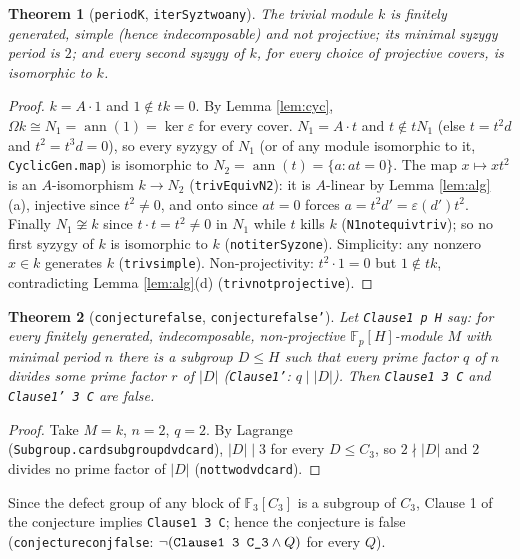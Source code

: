 \documentclass[11pt]{article}
\renewcommand{\_}{\oldus\allowbreak}
\newtheorem{theorem}{Theorem}
\theoremstyle{definition}
\theoremstyle{remark}
\begin{document}
\begin{theorem}[\texttt{period\_K}, \texttt{iterSyz\_two\_any}]
The trivial module $k$ is finitely generated, simple (hence indecomposable) and not projective; its
minimal syzygy period is $2$; and every second syzygy of $k$, for every choice of projective covers,
is isomorphic to $k$.
\end{theorem}
\begin{proof}
$k=A\cdot1$ and $1\notin tk=0$. By Lemma \ref{lem:cyc}, $\Omega k\cong N_1=\operatorname{ann}(1)=\ker\varepsilon$
for every cover. $N_1=A\cdot t$ and $t\notin tN_1$ (else $t=t^2d$ and $t^2=t^3d=0$), so every
syzygy of $N_1$ (or of any module isomorphic to it, \texttt{CyclicGen.map}) is isomorphic to
$N_2=\operatorname{ann}(t)=\{a: at=0\}$. The map $x\mapsto xt^2$ is an $A$-isomorphism $k\to N_2$
(\texttt{trivEquivN2}): it is $A$-linear by Lemma \ref{lem:alg}(a), injective since $t^2\ne0$, and onto
since $at=0$ forces $a=t^2d'=\varepsilon(d')t^2$. Finally $N_1\not\cong k$ since $t\cdot t=t^2\ne0$ in
$N_1$ while $t$ kills $k$ (\texttt{N1\_not\_equiv\_triv}); so no first syzygy of $k$ is isomorphic to
$k$ (\texttt{not\_iterSyz\_one}). Simplicity: any nonzero $x\in k$ generates $k$ (\texttt{triv\_simple}).
Non-projectivity: $t^2\cdot1=0$ but $1\notin tk$, contradicting Lemma \ref{lem:alg}(d)
(\texttt{triv\_not\_projective}).
\end{proof}

\begin{theorem}[\texttt{conjecture\_4053\_false}, \texttt{conjecture\_4053\_false'}]
Let \texttt{Clause1 p H} say: for every finitely generated, indecomposable, non-projective
$\mathbb{F}_p[H]$-module $M$ with minimal period $n$ there is a subgroup $D\le H$ such that every prime
factor $q$ of $n$ divides some prime factor $r$ of $|D|$ (\texttt{Clause1'}: $q\mid|D|$). Then
\texttt{Clause1 3 C\_3} and \texttt{Clause1' 3 C\_3} are false.
\end{theorem}
\begin{proof}
Take $M=k$, $n=2$, $q=2$. By Lagrange (\texttt{Subgroup.card\_subgroup\_dvd\_card}), $|D|\mid 3$ for every
$D\le C_3$, so $2\nmid|D|$ and $2$ divides no prime factor of $|D|$ (\texttt{not\_two\_dvd\_card}).
\end{proof}

Since the defect group of any block of $\mathbb{F}_3[C_3]$ is a subgroup of $C_3$, Clause 1 of the
conjecture implies \texttt{Clause1 3 C\_3}; hence the conjecture is false
(\texttt{conjecture\_4053\_conj\_false}: $\neg(\texttt{Clause1 3 C\_3}\wedge Q)$ for every $Q$).
\end{document}
